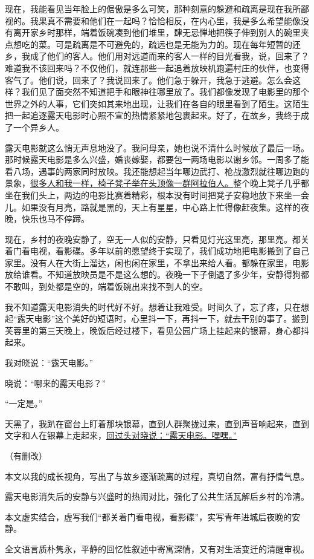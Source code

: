 \documentclass[11pt,a4paper]{ctexart}
\begin{document}
\begin{materialtext}
现在，我能看见当年脸上的倨傲是多么可笑，那种刻意的躲避和疏离是现在我所鄙视的。我果真不需要和他们在一起吗？恰恰相反，在内心里，我是多么希望能像没有离开家乡时那样，端着饭碗凑到他们堆里，肆无忌惮地把筷子伸到别人的碗里夹点想吃的菜。可是疏离是不可避免的，疏远也是无能为力的。现在每年短暂的还乡，我成了他们的客人。他们用对远道而来的客人一样的目光看我，说，回来了？难道我不该回来吗？不仅他们，就连那些一起追着放映机跑遍村庄的伙伴，也变得客气了。他们说，回来了？我说回来了。他们急于躲开，我急于逃避。怎么会这样？我们见了面突然不知道把手和眼神往哪里放了。我们都像发现了电影里的那个世界之外的人事，它们突如其来地出现，让我们在各自的眼里看到了陌生。这陌生把一起追逐露天电影时心照不宣的热情紧紧地包裹起来。好了，在故乡，我终于成了一个异乡人。

露天电影就这么悄无声息地没了。我问母亲，她也说不清什么时候放了最后一场。那时候露天电影是多么兴盛，婚丧嫁娶，都要包一两场电影以谢乡邻。一周多了能看八场，遇事的两家同时放映。我还能想起当年哪边武打、枪战激烈就往哪边跑的景象，\uline{很多人和我一样，椅子凳子举在头顶像一群阿拉伯人。}整个晚上凳子几乎都坐在我们头上，两边的电影比赛着精彩，根本没有时间把凳子安稳地放下来坐一会儿。如果没有月亮，路就是黑的，天上有星星，中心路上忙得像赶夜集。这样的夜晚，快乐也马不停蹄。

现在，乡村的夜晚安静了，空无一人似的安静，只看见灯光这里亮，那里亮。都关着门看电视，看影碟。多年以前的愿望终于实现了，我们成功地把电影搬到了自己家里。没有人在大街上溜达，闲也闲在家里，不拿出来给人看。都躲在家里，电影放给谁看。不知道放映员是不是这么想的。夜晚一下子倒退了多少年，安静得狗都不敢叫，到处都是空的，端着饭碗出来找不到人的空。

我不知道露天电影消失的时代好不好。想着让我难受。时间久了，忘了疼，只在想起“露天电影”这个美好的短语时，心里抖一下，再抖一下，就去干别的事了。搬到芙蓉里的第三天晚上，晚饭后经过楼下，看见公园广场上挂起来的银幕，身心都抖起来。

我对晓说：“露天电影。”

晓说：“哪来的露天电影？”

“一定是。”

天黑了，我趴在窗台上盯着那块银幕，直到人群聚拢过来，直到声音响起来，直到文字和人在银幕上走起来，\uline{回过头对晓说：“露天电影。嘿嘿。”}
\end{materialtext}
\begin{flushright}（有删改）\end{flushright}

\begin{choices}
\item 本文以我的成长视角，写出了与故乡逐渐疏离的过程，真切自然，富有抒情气息。
\item 露天电影消失后的安静与兴盛时的热闹对比，强化了公共生活瓦解后乡村的冷清。
\item 本文虚实结合，虚写我们“都关着门看电视，看影碟”，实写青年进城后夜晚的安静。
\item 全文语言质朴隽永，平静的回忆性叙述中寄寓深情，又有对生活变迁的清醒审视。
\end{choices}
\end{document}

